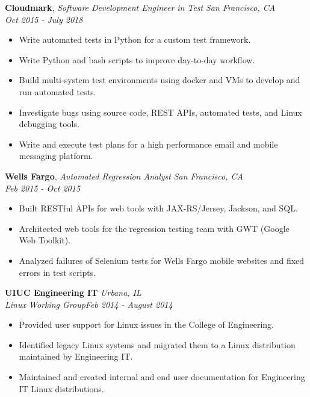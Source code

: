 \documentclass{article}
\newenvironment{changemargin}[2]{%
  \begin{list}{}{%
    \setlength{\topsep}{0pt}%
    \setlength{\leftmargin}{#1}%
    \setlength{\rightmargin}{#2}%
    \setlength{\listparindent}{\parindent}%
    \setlength{\itemindent}{\parindent}%
    \setlength{\parsep}{\parskip}%
  }%
  \item[]}{\end{list}
}
\newenvironment{body} {
	\vspace*{-16pt}
	\begin{changemargin}{-0.25in}{-0.5in}
  }	
	{\end{changemargin}
}
\begin{document}
\begin{body}

	\vspace{20pt}
	\textbf{Cloudmark}, \emph{Software Development Engineer in Test} \hfill \emph{San Francisco, CA}\\
	\hfill \emph{Oct 2015 - July 2018}\\
	\vspace*{-16pt}
	\begin{itemize} \itemsep -0pt  %
		\item Write automated tests in Python for a custom test framework.
		\item Write Python and bash scripts to improve day-to-day workflow.
		\item Build multi-system test environments using docker and VMs to develop and run automated tests.
		\item Investigate bugs using source code, REST APIs, automated tests, and Linux debugging tools.
		\item Write and execute test plans for a high performance email and mobile messaging platform.
	\end{itemize}
	
	\vspace{14pt}
	\textbf{Wells Fargo}, \emph{Automated Regression Analyst} \hfill \emph{San Francisco, CA}\\
	\hfill \emph{Feb 2015 - Oct 2015}\\
	\vspace*{-16pt}
	\begin{itemize} \itemsep -0pt  %
		\item Built RESTful APIs for web tools with JAX-RS/Jersey, Jackson, and SQL.
		\item Architected web tools for the regression testing team with GWT (Google Web Toolkit).
		\item Analyzed failures of Selenium tests for Wells Fargo mobile websites and fixed errors in test scripts.		
	\end{itemize}



	\vspace{14pt}
	\textbf{UIUC Engineering IT} \hfill \emph{Urbana, IL}\\
	\emph{Linux Working Group}\hfill \emph{Feb 2014 - August 2014}\\

	\begin{itemize} \itemsep -0pt  %
		\item Provided user support for Linux issues in the College of Engineering.
		\item Identified legacy Linux systems and migrated them to a Linux distribution maintained by Engineering IT.
		\item Maintained and created internal and end user documentation for Engineering IT Linux distributions.
	\end{itemize}


\end{body}
\end{document}
